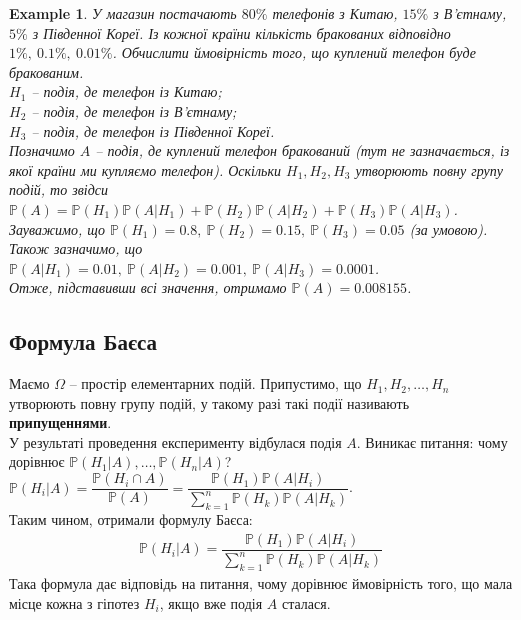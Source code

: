 \documentclass[a4paper, 10pt]{article}
\theoremstyle{theoremdd}
\newtheorem{example}[theorem]{Example}
\begin{document}
\begin{example}
У магазин постачають $80\%$ телефонів з Китаю, $15\%$ з В'єтнаму, $5\%$ з Південної Кореї. Із кожної країни кількість бракованих відповідно $1\% ,\ 0.1\% ,\ 0.01\%$. Обчислити ймовірність того, що куплений телефон буде бракованим.\\
$H_1$ -- подія, де телефон із Китаю;\\
$H_2$ -- подія, де телефон із В'єтнаму;\\
$H_3$ -- подія, де телефон із Південної Кореї.\\
Позначимо $A$ -- подія, де куплений телефон бракований (тут не зазначається, із якої країни ми купляємо телефон). Оскільки $H_1,H_2,H_3$ утворюють повну групу подій, то звідси\\
$\mathbb{P}(A) = \mathbb{P}(H_1) \mathbb{P}(A|H_1) + \mathbb{P}(H_2) \mathbb{P}(A|H_2) + \mathbb{P}(H_3) \mathbb{P}(A|H_3)$.\\
Зауважимо, що $\mathbb{P}(H_1) = 0.8,\ \mathbb{P}(H_2) = 0.15,\ \mathbb{P}(H_3) = 0.05$ (за умовою).\\
Також зазначимо, що $\mathbb{P}(A|H_1) = 0.01,\ \mathbb{P}(A|H_2) = 0.001,\ \mathbb{P}(A|H_3) = 0.0001$.\\
Отже, підставивши всі значення, отримамо $\mathbb{P}(A) = 0.008155$.
\end{example}

\subsection{Формула Баєса}
Маємо $\Omega$ -- простір елементарних подій. Припустимо, що $H_1,H_2,\dots,H_n$ утворюють повну групу подій, у такому разі такі події називають \textbf{припущеннями}.\\
У результаті проведення експерименту відбулася подія $A$. Виникає питання: чому дорівнює $\mathbb{P}(H_1|A),\dots,\mathbb{P}(H_n|A)$?\\
$\mathbb{P}(H_i|A) = \dfrac{\mathbb{P}(H_i \cap A)}{\mathbb{P}(A)} = \dfrac{\mathbb{P}(H_1) \mathbb{P}(A|H_i)}{\sum_{k=1}^n \mathbb{P}(H_k) \mathbb{P}(A|H_k)}$.\\
Таким чином, отримали формулу Баєса:
\begin{align*}
\mathbb{P}(H_i|A) = \dfrac{\mathbb{P}(H_1) \mathbb{P}(A|H_i)}{\displaystyle\sum_{k=1}^n \mathbb{P}(H_k)\mathbb{P}(A|H_k)}
\end{align*}
Така формула дає відповідь на питання, чому дорівнює ймовірність того, що мала місце кожна з гіпотез $H_i$, якщо вже подія $A$ сталася.
\end{document}
